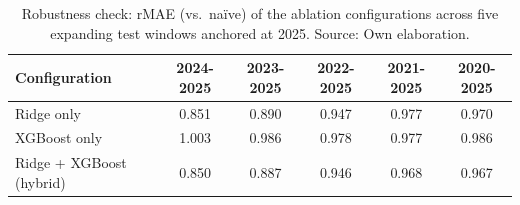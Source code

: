 \begin{table}[H]
    \centering
    \caption{Robustness check: rMAE (vs.\ naïve) of the ablation configurations across five expanding test windows anchored at 2025. Source: Own elaboration.}
    \label{tab:rolling_ablation}
    \begin{tabular}{lccccc}
        \toprule
        \textbf{Configuration} & \textbf{2024-2025} & \textbf{2023-2025} & \textbf{2022-2025} & \textbf{2021-2025} & \textbf{2020-2025} \\
        \midrule
        Ridge only & 0.851 & 0.890 & 0.947 & 0.977 & 0.970 \\
        XGBoost only & 1.003 & 0.986 & 0.978 & 0.977 & 0.986 \\
        Ridge + XGBoost (hybrid) & 0.850 & 0.887 & 0.946 & 0.968 & 0.967 \\
        \bottomrule
    \end{tabular}
\end{table}